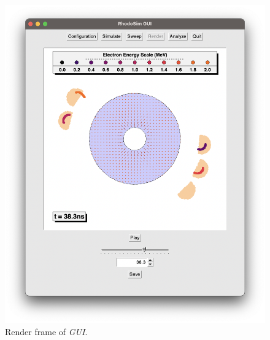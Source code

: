 \documentclass[a4paper,oneside,12pt]{report}
\numberwithin{equation}{chapter}
\begin{document}
{\begin{figure}
    \centering
    \includegraphics[width=\linewidth]{./figures/rhodoSim/GUI_render_frame_6.png}
    \caption{Render frame of \textit{GUI}.}
    \label{fig:gui_render_2}
\end{figure}

}
\end{document}
